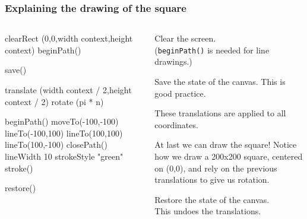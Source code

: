 \documentclass{beamer}
\begin{document}
\begin{frame}[fragile]
\frametitle{Explaining the drawing of the square}

\tiny

\begin{columns}[t]
\begin{column}{0.5\textwidth}

\begin{codeblock}[0.9]
\begin{semiverbatim}
clearRect (0,0,width context,height context)
beginPath()
\end{semiverbatim}
\end{codeblock}

\begin{codeblock}[0.9]
\begin{semiverbatim}
save()
\end{semiverbatim}
\end{codeblock}

\begin{codeblock}[0.9]
\begin{semiverbatim}
translate (width context / 2,height context / 2)
rotate (pi * n)
\end{semiverbatim}
\end{codeblock}

\begin{codeblock}[0.9]
\begin{semiverbatim}
beginPath()
moveTo(-100,-100)
lineTo(-100,100)
lineTo(100,100)
lineTo(100,-100)
closePath()
lineWidth 10
strokeStyle "green"
stroke()
\end{semiverbatim}
\end{codeblock}

\begin{codeblock}[0.9]
\begin{semiverbatim}
restore()
\end{semiverbatim}
\end{codeblock}

\end{column}
\begin{column}{0.4\textwidth}

\vskip 10pt
\noindent
Clear the screen.\\
({\tt beginPath()} is needed for line drawings.)

\vskip 20pt
\noindent
Save the state of the canvas. This is good practice.


\vskip 20pt
\noindent
These translations are applied to all coordinates.

\vskip 20pt
\noindent
At last we can draw the square!  Notice how we draw
a 200x200 square, centered on (0,0), 
and rely on the previous translations
to give us rotation.

\vskip 55pt
\noindent
Restore the state of the canvas.\\
This undoes the translations.

\end{column}
\end{columns} 
\end{frame}
\end{document}
